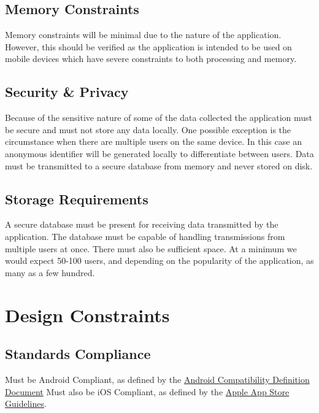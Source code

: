\documentclass[a4wide]{article}
\begin{document}
\subsection{Memory Constraints}
Memory constraints will be minimal due to the nature of the application.
However, this should be verified as the application is intended to be used on
mobile devices which have severe constraints to both processing and memory.

\subsection{Security \& Privacy}
Because of the sensitive nature of some of the data collected the application
must be secure and must not store any data locally.  One possible exception is
the circumstance when there are multiple users on the same device.  In this case
an anonymous identifier will be generated locally to differentiate between
users.  Data must be transmitted to a secure database from memory and never
stored on disk.

\subsection{Storage Requirements}
A secure database must be present for receiving data transmitted by the
application.  The database must be capable of handling transmissions from
multiple users at once.  There must also be sufficient space.  At a minimum we
would expect 50-100 users, and depending on the popularity of the application,
as many as a few hundred.



\section{Design Constraints}

\subsection{Standards Compliance}

Must be Android Compliant, as defined by the \href{http://static.googleusercontent.com/media/source.android.com/en/us/compatibility/4.0/android-4.0-cdd.pdf}{Android Compatibility Definition Document}
Must also be iOS Compliant, as defined by the \href{https://developer.apple.com/app-store/review/guidelines/}{Apple App Store Guidelines}.
\end{document}
